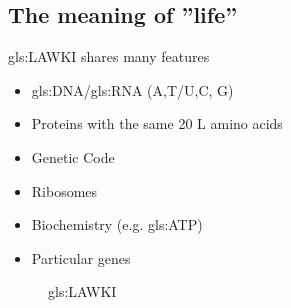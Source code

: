 \documentclass[]{article}
\begin{document}
\subsection{The meaning of ''life''}
\gls{gls:LAWKI} shares many features
\begin{itemize}
	\item \gls{gls:DNA}/\gls{gls:RNA} (A,T/U,C, G)
	\item Proteins with the same 20 L amino acids
	\item Genetic Code
	\item Ribosomes
	\item Biochemistry (e.g. \gls{gls:ATP})
	\item Particular genes
\end{itemize}

\begin{figure}[H]
	\caption{\acrfull{gls:LAWKI}}\label{fig:LUCA_figs} 
	

\end{figure}
\end{document}
